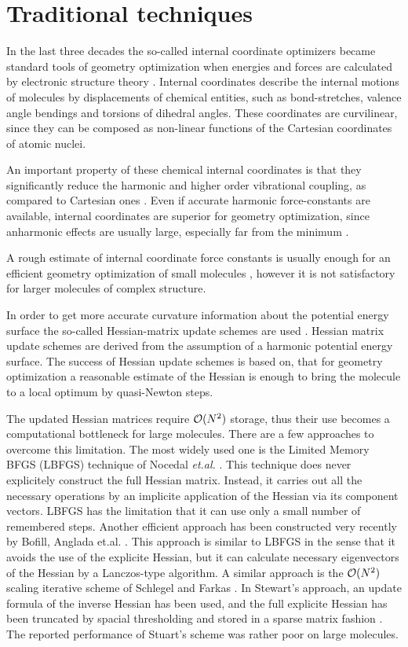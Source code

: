 \documentclass[prl,aps,twocolumn,showpacs,twocolumngrid,superbib]{revtex4}
\begin{document}
\section{Traditional techniques}
In the last three decades the so-called internal coordinate 
optimizers became standard tools of geometry optimization when energies 
and forces are calculated by electronic structure theory 
\cite{Pulay_natural_internals}.
Internal coordinates describe the internal motions of molecules 
by displacements of chemical entities, such as bond-stretches, 
valence angle bendings and torsions of dihedral angles. These 
coordinates are curvilinear, since they can be composed
as non-linear functions of the Cartesian coordinates of atomic nuclei.

An important property of these chemical internal coordinates
is that they significantly reduce the harmonic and higher order 
vibrational coupling, as compared to Cartesian ones 
\cite{pulay_dynamics,Baker_deloc_1}. 
Even if accurate harmonic force-constants are available, 
internal coordinates are superior for geometry optimization, 
since anharmonic effects are
usually large, especially far from the minimum 
\cite{Baker_deloc_1}. 

A rough estimate of internal coordinate force constants is usually 
enough for an efficient geometry optimization of small molecules
\cite{bakken,fogarasi_diaghess}, however it is not satisfactory
for larger molecules of complex structure.

In order to get more accurate curvature information about the 
potential energy surface the so-called Hessian-matrix update schemes
are used \cite{RFletcher}. 
Hessian matrix update schemes are derived from the assumption of a 
harmonic potential energy surface. 
The success of Hessian update schemes is based on, that for geometry 
optimization a reasonable estimate of the Hessian 
is enough to bring the molecule to a local optimum by 
quasi-Newton steps. 

The updated Hessian matrices require ${\cal{O}}(N^{2})$ storage, thus
their use becomes a computational bottleneck for large molecules.
There are a few approaches to overcome this limitation.
The most widely used one is the Limited Memory BFGS (LBFGS) 
technique of Nocedal
{\it et.al.} \cite{nocedal_lbgs}. This technique does never explicitely 
construct the full Hessian matrix. Instead, it carries out all 
the necessary operations by an implicite application of the Hessian
via its component vectors. LBFGS
has the limitation that it can use only a small number of remembered
steps.
Another efficient approach has been constructed very recently by Bofill,
Anglada et.al. \cite{bofill_lanczos}. This approach is similar
to LBFGS in the sense that it avoids the use of the explicite
Hessian, but it can calculate necessary eigenvectors of the 
Hessian by a Lanczos-type algorithm. A
similar approach is the ${\cal{O}}(N^{2})$ scaling iterative
scheme of Schlegel and Farkas \cite{schlegel_on2iter}.
In Stewart's approach, an update
formula of the inverse Hessian has been used, and the full explicite
Hessian has been truncated by spacial thresholding and stored in a 
sparse matrix fashion \cite{Stewart_crambin_opt}. 
The reported performance
of Stuart's scheme was rather poor on large molecules.
\end{document}

